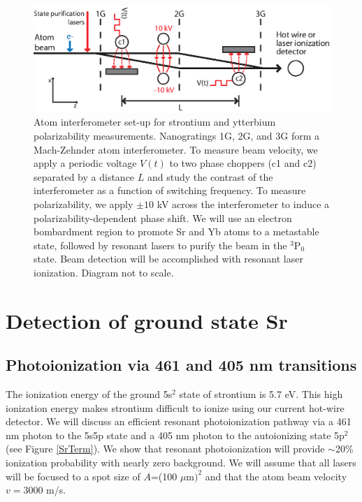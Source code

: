 \begin{figure}
\includegraphics[width=1\textwidth]{Figures/IFMgradEfigNIST2011full.eps}
\caption[Atom interferometer configuration for strontium and ytterbium polarizability measurements.]{\label{IFMgradEfigSrYb}Atom interferometer set-up for strontium and ytterbium polarizability measurements. Nanogratings 1G, 2G, and 3G form a Mach-Zehnder atom interferometer. To measure beam velocity, we apply a periodic voltage $V(t)$ to two phase choppers (c1 and c2) separated by a distance $L$ and study the contrast of the interferometer as a function of switching frequency. To measure polarizability, we apply $\pm10$ kV across the interferometer to induce a polarizability-dependent phase shift. We will use an electron bombardment region to promote Sr and Yb atoms to a metastable state, followed by resonant lasers to purify the beam in the $^3\textrm{P}_0$ state. Beam detection will be accomplished with resonant laser ionization. Diagram not to scale.}
\end{figure}





\section{Detection of ground state Sr}

\subsection{Photoionization via 461 and 405 nm transitions}
The ionization energy of the ground 5s$^2$ \sSz state of strontium is 5.7 eV. This high ionization energy makes strontium difficult to ionize using our current hot-wire detector. We will discuss an efficient resonant photoionization pathway via a 461 nm photon to the 5s5p \sPo state and a 405 nm photon to the autoionizing state 5p$^2$ \sDt \cite{Men95,Van06,Haq07} (see Figure \ref{SrTerm}). We show that resonant photoionization will provide $\sim$20\% ionization probability with nearly zero background. We will assume that all lasers will be focused to a spot size of $A$=(100 $\mu\textrm{m})^2$ and that the atom beam velocity $v=3000$ m/s.

